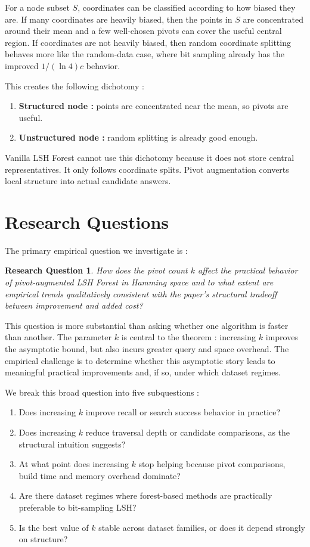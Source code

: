 \documentclass[11pt]{article}
\newtheorem{question}{Research Question}
\begin{document}
For a node subset $S$, coordinates can be classified according to how biased they are. If many coordinates are heavily biased, then the points in $S$ are concentrated around their mean and a few well-chosen pivots can cover the useful central region. If coordinates are not heavily biased, then random coordinate splitting behaves more like the random-data case, where bit sampling already has the improved $1/(\ln 4)c$ behavior.

This creates the following dichotomy :
\begin{enumerate}[leftmargin=*]
    \item \textbf{Structured node :} points are concentrated near the mean, so pivots are useful.
    \item \textbf{Unstructured node :} random splitting is already good enough.
\end{enumerate}
Vanilla LSH Forest cannot use this dichotomy because it does not store central representatives. It only follows coordinate splits. Pivot augmentation converts local structure into actual candidate answers.

\section{Research Questions}

The primary empirical question we investigate is :

\begin{question}
How does the pivot count $k$ affect the practical behavior of pivot-augmented LSH Forest in Hamming space and to what extent are empirical trends qualitatively consistent with the paper's structural tradeoff between improvement and added cost?
\end{question}

This question is more substantial than asking whether one algorithm is faster than another. The parameter $k$ is central to the theorem : increasing $k$ improves the asymptotic bound, but also incurs greater query and space overhead. The empirical challenge is to determine whether this asymptotic story leads to meaningful practical improvements and, if so, under which dataset regimes.

We break this broad question into five subquestions :
\begin{enumerate}[leftmargin=*]
    \item Does increasing $k$ improve recall or search success behavior in practice?
    \item Does increasing $k$ reduce traversal depth or candidate comparisons, as the structural intuition suggests?
    \item At what point does increasing $k$ stop helping because pivot comparisons, build time and memory overhead dominate?
    \item Are there dataset regimes where forest-based methods are practically preferable to bit-sampling LSH?
    \item Is the best value of $k$ stable across dataset families, or does it depend strongly on structure?
\end{enumerate}
\end{document}
